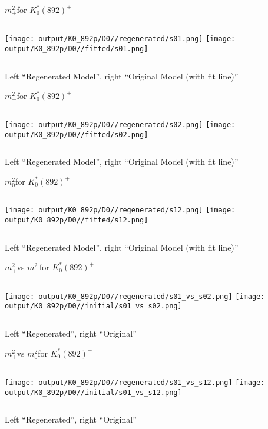 \documentclass{beamer}
\newcommand{\MP}{\ensuremath{m^2_+}}
\newcommand{\MM}{\ensuremath{m^2_-}}
\newcommand{\MZ}{\ensuremath{m^2_0}}
\begin{document}
\begin{frame}{\MP for $K_0^*(892)^+$}
\begin{columns}[t]
\centering
\texttt{[image: output/K0\_892p/D0//regenerated/s01.png]}
\centering
\texttt{[image: output/K0\_892p/D0//fitted/s01.png]}
\end{columns}
    \centering
    Left ``Regenerated Model'', right ``Original Model (with fit line)''
\end{frame}                   

\begin{frame}{\MM for $K_0^*(892)^+$}
\begin{columns}[t]
\centering
\texttt{[image: output/K0\_892p/D0//regenerated/s02.png]}
\centering
\texttt{[image: output/K0\_892p/D0//fitted/s02.png]}
\end{columns}
    \centering
    Left ``Regenerated Model'', right ``Original Model (with fit line)''
\end{frame}                   

\begin{frame}{\MZ for $K_0^*(892)^+$}
\begin{columns}[t]
\centering
\texttt{[image: output/K0\_892p/D0//regenerated/s12.png]}
\centering
\texttt{[image: output/K0\_892p/D0//fitted/s12.png]}
\end{columns}
    \centering
    Left ``Regenerated Model'', right ``Original Model (with fit line)''
\end{frame}                   


\begin{frame}{\MP vs \MM for $K_0^*(892)^+$}
\begin{columns}[t]
\centering
\texttt{[image: output/K0\_892p/D0//regenerated/s01\_vs\_s02.png]}
\centering
\texttt{[image: output/K0\_892p/D0//initial/s01\_vs\_s02.png]}
\end{columns}
    \centering
    Left ``Regenerated'', right ``Original''
\end{frame} 


\begin{frame}{\MP vs \MZ for $K_0^*(892)^+$}
\begin{columns}[t]
\centering
\texttt{[image: output/K0\_892p/D0//regenerated/s01\_vs\_s12.png]}
\centering
\texttt{[image: output/K0\_892p/D0//initial/s01\_vs\_s12.png]}
\end{columns}
    \centering
    Left ``Regenerated'', right ``Original''
\end{frame} 
\end{document}
